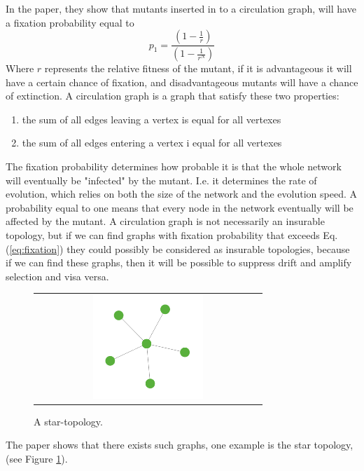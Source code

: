 In the \cite{lieberman2005evolutionary} paper, they show that mutants inserted in to a
 circulation graph, will have a fixation probability equal to
\begin{equation}  p_{1}=\frac{(1-\frac{1}{r})}{(1-\frac{1}{r^{N}})} \label{eq:fixation} \end{equation}
Where $r$ represents the relative fitness of the mutant, if it is advantageous it will have a certain chance of fixation, and disadvantageous mutants will have a chance of extinction. 
A circulation graph is a graph that satisfy these two properties:
\begin{enumerate}
\item the sum of all edges leaving a vertex is equal for all vertexes
\item the sum of all edges entering a vertex i equal for all vertexes
\end{enumerate}
The fixation probability determines how probable it is that the whole network will eventually be
"infected" by the mutant. I.e. it determines the rate of evolution, which relies on both the size of the
network and the evolution speed. 
A probability equal to one means that every node in the network eventually will be affected by the mutant.
A circulation graph is not necessarily an insurable topology, but if we can find graphs with  fixation probability that exceeds Eq.(\ref{eq:fixation}) they could possibly be considered as insurable topologies, because if we can find these graphs, then it will be possible to suppress drift and amplify selection and visa versa. 
\begin{figure}[b]
\centering
\begin{tabular}{@{}c@{}}
\includegraphics[width=0.5\textwidth]{../Figures/aStar.png}
\end{tabular}
\caption{
\label{fig:star} A star-topology. 
}
\end{figure}
The paper shows that there exists such graphs, one example is the star topology, (see Figure \ref{fig:star}).
